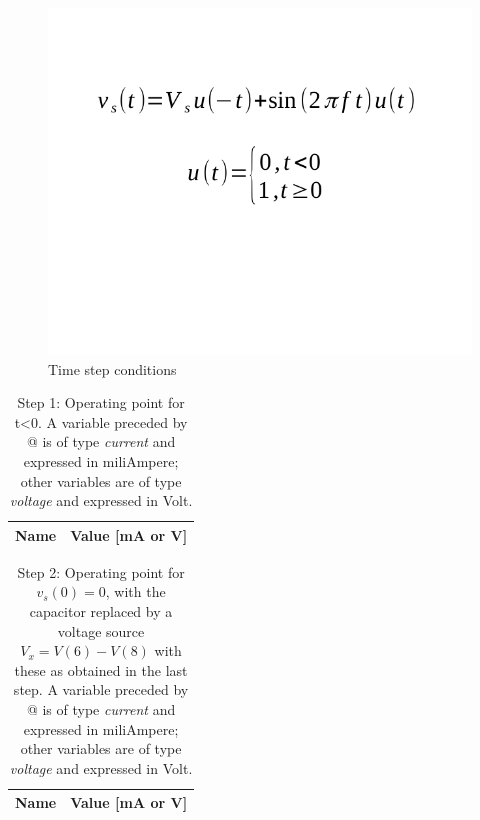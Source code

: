 \begin{figure}[h] \centering
\includegraphics[width=0.5\linewidth]{time_step.pdf}
\caption{Time step conditions}
\label{fig:time_step}
\end{figure}

\begin{table}[h]
  \centering
  \begin{tabular}{|l|r|}
    \hline    
    {\bf Name} & {\bf Value [mA or V]} \\ \hline
    
  \end{tabular}
  \caption{Step 1: Operating point for t<0. A variable preceded by @ is of type {\em current}
    and expressed in miliAmpere; other variables are of type {\it voltage} and expressed in
    Volt.}
  \label{tab:op}
\end{table}

\begin{table}[h]
  \centering
  \begin{tabular}{|l|r|}
    \hline    
    {\bf Name} & {\bf Value [mA or V]} \\ \hline
    
  \end{tabular}
  \caption{Step 2: Operating point for {\it $v_s(0)=0$}, with the capacitor replaced by a voltage source {\it $V_x=V(6)-V(8)$} with these as obtained in the last step. A variable preceded by @ is of type {\em current}
    and expressed in miliAmpere; other variables are of type {\it voltage} and expressed in
    Volt.}
  \label{tab:opeq}
\end{table}

